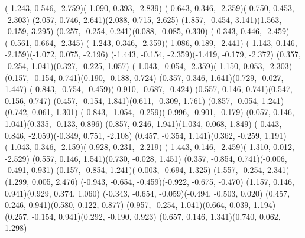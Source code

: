 \pstThreeDLine[linecolor=black](-1.243, 0.546, -2.759)(-1.090, 0.393, -2.839)
\pstThreeDLine[linecolor=gray](-0.643, 0.346, -2.359)(-0.750, 0.453, -2.303)
\pstThreeDLine[linecolor=black](2.057, 0.746, 2.641)(2.088, 0.715, 2.625)
\pstThreeDLine[linecolor=gray](1.857, -0.454, 3.141)(1.563, -0.159, 3.295)
\pstThreeDLine[linecolor=gray](0.257, -0.254, 0.241)(0.088, -0.085, 0.330)
\pstThreeDLine[linecolor=gray](-0.343, 0.446, -2.459)(-0.561, 0.664, -2.345)
\pstThreeDLine[linecolor=black](-1.243, 0.346, -2.359)(-1.086, 0.189, -2.441)
\pstThreeDLine[linecolor=black](-1.143, 0.146, -2.159)(-1.072, 0.075, -2.196)
\pstThreeDLine[linecolor=black](-1.443, -0.154, -2.359)(-1.419, -0.179, -2.372)
\pstThreeDLine[linecolor=gray](0.357, -0.254, 1.041)(0.327, -0.225, 1.057)
\pstThreeDLine[linecolor=gray](-1.043, -0.054, -2.359)(-1.150, 0.053, -2.303)
\pstThreeDLine[linecolor=black](0.157, -0.154, 0.741)(0.190, -0.188, 0.724)
\pstThreeDLine[linecolor=black](0.357, 0.346, 1.641)(0.729, -0.027, 1.447)
\pstThreeDLine[linecolor=gray](-0.843, -0.754, -0.459)(-0.910, -0.687, -0.424)
\pstThreeDLine[linecolor=gray](0.557, 0.146, 0.741)(0.547, 0.156, 0.747)
\pstThreeDLine[linecolor=black](0.457, -0.154, 1.841)(0.611, -0.309, 1.761)
\pstThreeDLine[linecolor=gray](0.857, -0.054, 1.241)(0.742, 0.061, 1.301)
\pstThreeDLine[linecolor=gray](-0.843, -1.054, -0.259)(-0.996, -0.901, -0.179)
\pstThreeDLine[linecolor=black](0.057, 0.146, 1.041)(0.335, -0.133, 0.896)
\pstThreeDLine[linecolor=black](0.857, 0.246, 1.941)(1.034, 0.068, 1.849)
\pstThreeDLine[linecolor=black](-0.443, 0.846, -2.059)(-0.349, 0.751, -2.108)
\pstThreeDLine[linecolor=gray](0.457, -0.354, 1.141)(0.362, -0.259, 1.191)
\pstThreeDLine[linecolor=black](-1.043, 0.346, -2.159)(-0.928, 0.231, -2.219)
\pstThreeDLine[linecolor=black](-1.443, 0.146, -2.459)(-1.310, 0.012, -2.529)
\pstThreeDLine[linecolor=black](0.557, 0.146, 1.541)(0.730, -0.028, 1.451)
\pstThreeDLine[linecolor=gray](0.357, -0.854, 0.741)(-0.006, -0.491, 0.931)
\pstThreeDLine[linecolor=gray](0.157, -0.854, 1.241)(-0.003, -0.694, 1.325)
\pstThreeDLine[linecolor=gray](1.557, -0.254, 2.341)(1.299, 0.005, 2.476)
\pstThreeDLine[linecolor=black](-0.943, -0.654, -0.459)(-0.922, -0.675, -0.470)
\pstThreeDLine[linecolor=gray](1.157, 0.146, 0.941)(0.929, 0.374, 1.060)
\pstThreeDLine[linecolor=gray](-0.343, -0.654, -0.059)(-0.494, -0.503, 0.020)
\pstThreeDLine[linecolor=black](0.457, 0.246, 0.941)(0.580, 0.122, 0.877)
\pstThreeDLine[linecolor=gray](0.957, -0.254, 1.041)(0.664, 0.039, 1.194)
\pstThreeDLine[linecolor=black](0.257, -0.154, 0.941)(0.292, -0.190, 0.923)
\pstThreeDLine[linecolor=black](0.657, 0.146, 1.341)(0.740, 0.062, 1.298)

